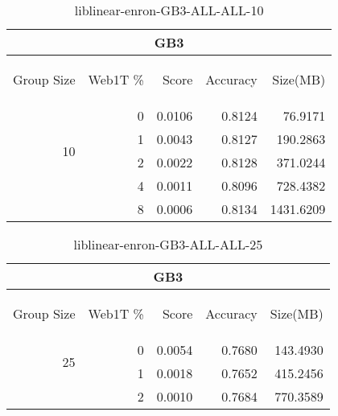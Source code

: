 \begin{center}
\begin{table}[htbp]
\begin{tabular}{ | r | r | r | r | r |}
\hline
\multicolumn{5}{|c|}{GB3}\\
\hline
\begin{sideways}Group Size\end{sideways} & \begin{sideways}Web1T \%\end{sideways} & \begin{sideways}Score\end{sideways} & \begin{sideways}Accuracy\end{sideways} & \begin{sideways}Size(MB)\end{sideways}\\
\hline
\multirow{4}{*}{10}
 & 0 & 0.0106 & 0.8124 & 76.9171\\ \cline{2-5}
 & 1 & 0.0043 & 0.8127 & 190.2863\\ \cline{2-5}
 & 2 & 0.0022 & 0.8128 & 371.0244\\ \cline{2-5}
 & 4 & 0.0011 & 0.8096 & 728.4382\\ \cline{2-5}
 & 8 & 0.0006 & 0.8134 & 1431.6209\\ \cline{2-5}
\hline
\end{tabular}
\caption{liblinear-enron-GB3-ALL-ALL-10}
\label{table:liblinear-enron-GB3-ALL-ALL-10}
\end{table}
\end{center}

\begin{center}
\begin{table}[htbp]
\begin{tabular}{ | r | r | r | r | r |}
\hline
\multicolumn{5}{|c|}{GB3}\\
\hline
\begin{sideways}Group Size\end{sideways} & \begin{sideways}Web1T \%\end{sideways} & \begin{sideways}Score\end{sideways} & \begin{sideways}Accuracy\end{sideways} & \begin{sideways}Size(MB)\end{sideways}\\
\hline
\multirow{2}{*}{25}
 & 0 & 0.0054 & 0.7680 & 143.4930\\ \cline{2-5}
 & 1 & 0.0018 & 0.7652 & 415.2456\\ \cline{2-5}
 & 2 & 0.0010 & 0.7684 & 770.3589\\ \cline{2-5}
\hline
\end{tabular}
\caption{liblinear-enron-GB3-ALL-ALL-25}
\label{table:liblinear-enron-GB3-ALL-ALL-25}
\end{table}
\end{center}

